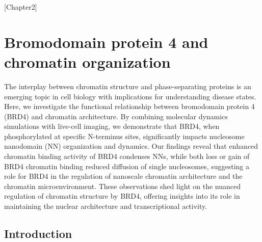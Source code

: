 [Chapter2]

\chapter{Bromodomain protein 4 and chromatin organization}

The interplay between chromatin structure and phase-separating proteins is an emerging topic in cell biology with implications for understanding disease states. Here, we investigate the functional relationship between bromodomain protein 4 (BRD4) and chromatin architecture. By combining molecular dynamics simulations with live-cell imaging, we demonstrate that BRD4, when phosphorylated at specific N-terminus sites, significantly impacts nucleosome nanodomain (NN) organization and dynamics. Our findings reveal that enhanced chromatin binding activity of BRD4 condenses NNs, while both loss or gain of BRD4 chromatin binding reduced diffusion of single nucleosomes, suggesting a role for BRD4 in the regulation of nanoscale chromatin architecture and the chromatin microenvironment. These observations shed light on the nuanced regulation of chromatin structure by BRD4, offering insights into its role in maintaining the nuclear architecture and transcriptional activity.

\section{Introduction}

